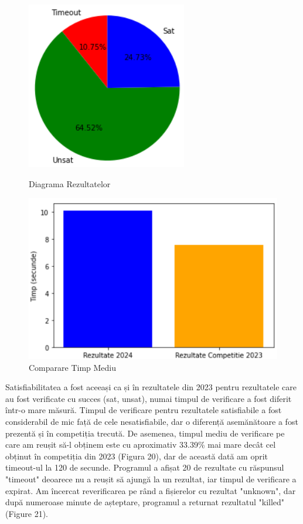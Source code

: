 \documentclass[12pt,a4paper]{article}
\theoremstyle{definition}
\theoremstyle{remark}
\begin{document}
\begin{figure}[!htb]
   \begin{minipage}{0.48\textwidth}
     \centering
     \includegraphics[width=.65\linewidth]{diag3.png}
     \caption{Diagrama Rezultatelor}\label{Fig:Data1}
   \end{minipage}\hfill
   \begin{minipage}{0.48\textwidth}
     \centering
     \includegraphics[width=1\linewidth]{diag4.png}
     \caption{Comparare Timp Mediu}\label{Fig:Data2}
   \end{minipage}
\end{figure}
Satisfiabilitatea a fost aceeași ca și în rezultatele din 2023 pentru rezultatele care au fost verificate cu succes (sat, unsat), numai timpul de verificare a fost diferit într-o mare măsură. Timpul de verificare pentru rezultatele satisfiabile a fost considerabil de mic față de cele nesatisfiabile, dar o diferență asemănătoare a fost prezentă și în competiția trecută. De asemenea, timpul mediu de verificare pe care am reușit să-l obținem este cu aproximativ 33.39\% mai mare decât cel obținut în competiția din 2023 (Figura 20), dar de această dată am oprit timeout-ul la 120 de secunde. Programul a afișat 20 de rezultate cu răspunsul "timeout" deoarece nu a reușit să ajungă la un rezultat, iar timpul de verificare a expirat. Am încercat reverificarea pe rând a fișierelor cu rezultat "unknown", dar după numeroase minute de așteptare, programul a returnat rezultatul "killed" (Figure 21). \par
\end{document}

